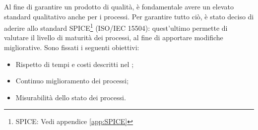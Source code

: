 Al fine di garantire un prodotto di qualità, è fondamentale avere un elevato standard qualitativo anche per i processi. Per garantire tutto ciò, è stato deciso di aderire allo standard {SPICE}\footnote{SPICE: Vedi appendice \cref{app:SPICE}} (ISO/IEC 15504): quest'ultimo permette di valutare il livello di {maturità} dei processi, al fine di apportare modifiche migliorative.\newline
Sono fissati i seguenti obiettivi:
\begin{itemize}
	\item Rispetto di tempi e costi descritti nel \PdP ;
	\item Continuo miglioramento dei processi;
	\item Misurabilità dello stato dei processi.
\end{itemize}
